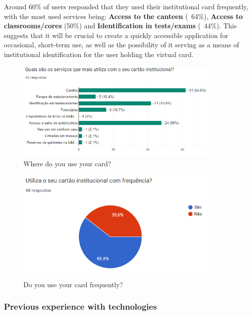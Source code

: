 \documentclass[10pt]{article}
\begin{document}
Around 60\% of users responded that they used their institutional card frequently, with the most used services being: \textbf{Access to the canteen} (~64\%), \textbf{Access to classrooms/cores} (50\%) and \textbf{Identification in tests/exams} (~44\%).
This suggests that it will be crucial to create a quickly accessible application for occasional, short-term use, as well as the possibility of it serving as a means of institutional identification for the user holding the virtual card.

\begin{figure}[h]
    \centering
    \includegraphics[width=0.9\textwidth]{report-images/questionaire2.png}
    \caption{Where do you use your card?}
    \label{fig:fig-4}
\end{figure}

\begin{figure}[h]
    \centering
    \includegraphics[width=0.9\textwidth]{report-images/questionaire3.png}
    \caption{Do you use your card frequently?}
    \label{fig:fig-5}
\end{figure}

\subsubsection{Previous experience with technologies}
\end{document}
